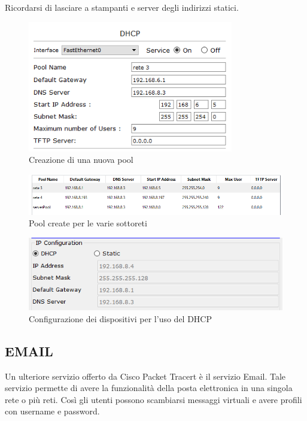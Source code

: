 \noindent Ricordarsi di lasciare a stampanti e server degli indirizzi statici.


\begin{figure}[htbp]
    \centering
    \includegraphics[width=0.8\textwidth]{images/06.servizi-rete/dhcp/01.conf-pool.png}
    \caption{Creazione di una nuova pool}
    \label{fig:dhcp-conf-pool}
\end{figure}

\begin{figure}[htbp]
    \centering
    \includegraphics[width=\textwidth]{images/06.servizi-rete/dhcp/02.pools.png}
    \caption{Pool create per le varie sottoreti}
    \label{fig:dhcp-pools}
\end{figure}

\begin{figure}[htbp]
    \centering
    \includegraphics[width=\textwidth]{images/06.servizi-rete/dhcp/03.conf-pc.png}
    \caption{Configurazione dei dispositivi per l'uso del DHCP}
    \label{fig:dhcp-conf-pc}
\end{figure}

\subsection{EMAIL}
Un ulteriore servizio offerto da Cisco Packet Tracert è il servizio Email. Tale servizio permette di avere la funzionalità della posta elettronica in una singola rete o più reti. Così gli utenti possono scambiarsi messaggi virtuali e avere profili con username e password.


